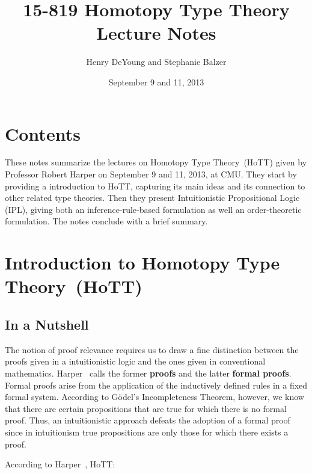 \documentclass[11pt]{article}
\newcommand{\HoTT}{Homotopy Type Theory}
\begin{document}
\title{15-819 Homotopy Type Theory\\ Lecture Notes}
\author{Henry DeYoung and Stephanie Balzer}
\date{September 9 and 11, 2013}

\maketitle

\section{Contents}\label{sec:contents}

These notes summarize the lectures on \HoTT\ (HoTT) given by Professor Robert Harper on
September 9 and 11, 2013, at CMU.  They start by providing a introduction to HoTT, capturing
its main ideas and its connection to other related type theories.  Then they present
Intuitionistic Propositional Logic (IPL), giving both an inference-rule-based formulation as
well an order-theoretic formulation.  The notes conclude with a brief summary.


\section{Introduction to \HoTT\ (HoTT)}\label{sec:intro}

\subsection{In a Nutshell}\label{subsec:hott_in_nutshell}

The notion of proof relevance requires us to draw a fine distinction between the proofs given
in a intuitionistic logic and the ones given in conventional mathematics.
Harper~\cite{Harper2012} calls the former \textbf{proofs} and the latter \textbf{formal
  proofs}.  Formal proofs arise from the application of the inductively defined rules in a
fixed formal system.  According to G\"{o}del's Incompleteness Theorem, however, we know that
there are certain propositions that are true for which there is no formal proof.  Thus, an
intuitionistic approach defeats the adoption of a formal proof since in intuitionism true
propositions are only those for which there exists a proof.

According to Harper~\cite{Harper2013a,Harper2013}, HoTT:
\end{document}
